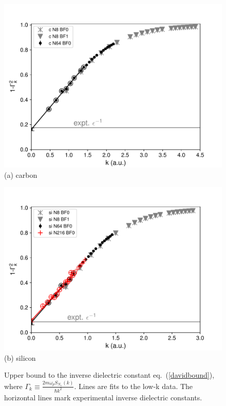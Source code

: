 \begin{figure}
\begin{minipage}[b]{\columnwidth}
\includegraphics[width=\columnwidth]{si45_uksk-c-gk2}
(a) carbon
\end{minipage}
\begin{minipage}[b]{\columnwidth}
\includegraphics[width=\columnwidth]{si45_uksk-si-gk2}
(b) silicon
\end{minipage}
\caption{Upper bound to the inverse dielectric constant  eq.~(\ref{davidbound}), where $\Gamma_k\equiv\frac{2m\omega_pS_{N_e}(k)}{\hbar k^2}$. Lines are fits to the low-k data. %
The horizontal lines mark experimental inverse dielectric constants.
\label{fig:c-si-gk}}
\end{figure}

